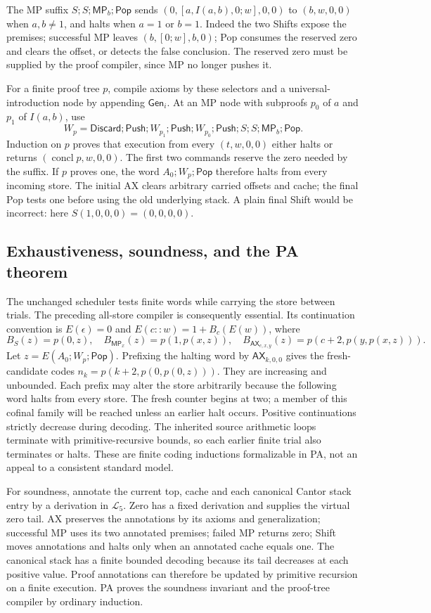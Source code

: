 The MP suffix $S;S;\mathsf{MP}_b;\mathsf{Pop}$ sends
$(0,[a,I(a,b),0;w],0,0)$ to $(b,w,0,0)$ when $a,b\ne1$, and halts when
$a=1$ or $b=1$.  Indeed the two Shifts expose the premises; successful MP
leaves $(b,[0;w],b,0)$; Pop consumes the reserved zero and clears the offset,
or detects the false conclusion.  The reserved zero must be supplied by
the proof compiler, since MP no longer pushes it.

For a finite proof tree $p$, compile axioms by these selectors and a
universal-introduction node by appending $\mathsf{Gen}_i$.  At an MP node
with subproofs $p_0$ of $a$ and $p_1$ of $I(a,b)$, use
\[
 W_p=\mathsf{Discard};\mathsf{Push};W_{p_1};\mathsf{Push};
 W_{p_0};\mathsf{Push};S;S;\mathsf{MP}_b;\mathsf{Pop}.
\]
Induction on $p$ proves that execution from every $(t,w,0,0)$ either halts
or returns $(\operatorname{concl}p,w,0,0)$.  The first two commands reserve
the zero needed by the suffix.  If $p$ proves one, the word
$A_0;W_p;\mathsf{Pop}$ therefore halts from every incoming store.
The initial AX clears arbitrary carried offsets and cache; the final Pop
tests one before using the old underlying stack.  A plain final Shift
would be incorrect: here $S(1,0,0,0)=(0,0,0,0)$.

\subsection{Exhaustiveness, soundness, and the PA theorem}

The unchanged scheduler tests finite words while carrying the store between
trials.  The preceding all-store compiler is consequently essential.
Its continuation convention is $E(\epsilon)=0$ and
$E(c::w)=1+B_c(E(w))$, where
\[
 B_S(z)=p(0,z),\quad B_{\mathsf{MP}_x}(z)=p(1,p(x,z)),\quad
 B_{\mathsf{AX}_{c,x,y}}(z)=p(c+2,p(y,p(x,z))).
\]
Let $z=E(A_0;W_p;\mathsf{Pop})$.  Prefixing the halting word by
$\mathsf{AX}_{k,0,0}$ gives the fresh-candidate codes
$n_k=p(k+2,p(0,p(0,z)))$.  They are increasing and unbounded.  Each prefix
may alter the store arbitrarily because the following word halts from
every store.  The fresh counter begins at two; a member of this cofinal
family will be reached unless an earlier halt occurs.  Positive
continuations strictly decrease during decoding.  The inherited source
arithmetic loops terminate with primitive-recursive bounds, so each earlier
finite trial also terminates or halts.  These are finite coding inductions
formalizable in PA, not an appeal to a consistent standard model.

For soundness, annotate the current top, cache and each canonical Cantor
stack entry by a derivation in $\mathcal L_5$.  Zero has a fixed derivation
and supplies the virtual zero tail.  AX preserves the annotations by its
axioms and generalization; successful MP uses its two annotated premises;
failed MP returns zero; Shift moves annotations and halts only when an
annotated cache equals one.  The canonical stack has a finite bounded
decoding because its tail decreases at each positive value.
Proof annotations can therefore be updated by primitive recursion on a
finite execution.  PA proves the soundness invariant and the proof-tree
compiler by ordinary induction.

